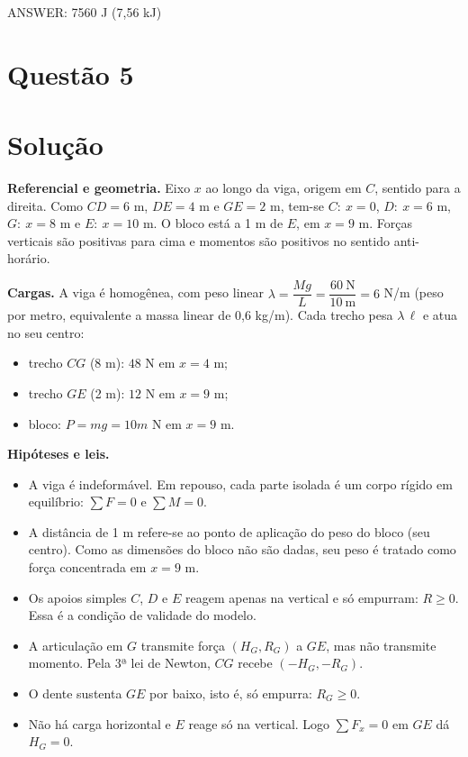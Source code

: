 \documentclass{article}%
\begin{document}
ANSWER: 7560 J (7,56 kJ)%
\newpage%
\section*{Questão 5}

\section*{Solução}

\textbf{Referencial e geometria.} Eixo $x$ ao longo da viga, origem em $C$, sentido para a direita. Como $CD=6$ m, $DE=4$ m e $GE=2$ m, tem-se $C:\ x=0$, $D:\ x=6$ m, $G:\ x=8$ m e $E:\ x=10$ m. O bloco está a 1 m de $E$, em $x=9$ m. Forças verticais são positivas para cima e momentos são positivos no sentido anti-horário.

\textbf{Cargas.} A viga é homogênea, com peso linear $\lambda=\dfrac{Mg}{L}=\dfrac{60\ \text{N}}{10\ \text{m}}=6$ N/m (peso por metro, equivalente a massa linear de 0,6 kg/m). Cada trecho pesa $\lambda\,\ell$ e atua no seu centro:
\begin{itemize}
\item trecho $CG$ (8 m): $48$ N em $x=4$ m;
\item trecho $GE$ (2 m): $12$ N em $x=9$ m;
\item bloco: $P=mg=10m$ N em $x=9$ m.
\end{itemize}

\textbf{Hipóteses e leis.}
\begin{itemize}
\item A viga é indeformável. Em repouso, cada parte isolada é um corpo rígido em equilíbrio: $\sum F=0$ e $\sum M=0$.
\item A distância de 1 m refere-se ao ponto de aplicação do peso do bloco (seu centro). Como as dimensões do bloco não são dadas, seu peso é tratado como força concentrada em $x=9$ m.
\item Os apoios simples $C$, $D$ e $E$ reagem apenas na vertical e só empurram: $R\geq 0$. Essa é a condição de validade do modelo.
\item A articulação em $G$ transmite força $(H_G,R_G)$ a $GE$, mas não transmite momento. Pela 3ª lei de Newton, $CG$ recebe $(-H_G,-R_G)$.
\item O dente sustenta $GE$ por baixo, isto é, só empurra: $R_G\geq 0$.
\item Não há carga horizontal e $E$ reage só na vertical. Logo $\sum F_x=0$ em $GE$ dá $H_G=0$.
\end{itemize}
\end{document}
